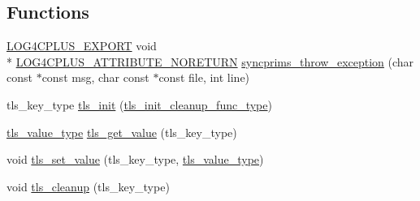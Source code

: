 \subsection*{Functions}
\begin{DoxyCompactItemize}
\item 
\hyperlink{config_8hxx_ab13cb1a5317c245ee2ef4f2bfe0cfb2d}{L\-O\-G4\-C\-P\-L\-U\-S\-\_\-\-E\-X\-P\-O\-R\-T} void \\*
\hyperlink{config_8hxx_a9e2009a9383c0007ef30ca204ad8b3e3}{L\-O\-G4\-C\-P\-L\-U\-S\-\_\-\-A\-T\-T\-R\-I\-B\-U\-T\-E\-\_\-\-N\-O\-R\-E\-T\-U\-R\-N} \hyperlink{namespacelog4cplus_1_1thread_1_1impl_ae8a0c65e304c0b6f4517d161a3fefc4c}{syncprims\-\_\-throw\-\_\-exception} (char const $\ast$const msg, char const $\ast$const file, int line)
\item 
tls\-\_\-key\-\_\-type \hyperlink{namespacelog4cplus_1_1thread_1_1impl_a2d9e610bc473a7dbf97926a4238be82f}{tls\-\_\-init} (\hyperlink{namespacelog4cplus_1_1thread_1_1impl_a4a2c43d8790236ed72370694f70a08c2}{tls\-\_\-init\-\_\-cleanup\-\_\-func\-\_\-type})
\item 
\hyperlink{namespacelog4cplus_1_1thread_1_1impl_a7964c384af774778b462bec9cc6581ea}{tls\-\_\-value\-\_\-type} \hyperlink{namespacelog4cplus_1_1thread_1_1impl_a5bb3a0df53f5294814544c31c5af238e}{tls\-\_\-get\-\_\-value} (tls\-\_\-key\-\_\-type)
\item 
void \hyperlink{namespacelog4cplus_1_1thread_1_1impl_a425a3d17d8589296a321aa3c556c2bca}{tls\-\_\-set\-\_\-value} (tls\-\_\-key\-\_\-type, \hyperlink{namespacelog4cplus_1_1thread_1_1impl_a7964c384af774778b462bec9cc6581ea}{tls\-\_\-value\-\_\-type})
\item 
void \hyperlink{namespacelog4cplus_1_1thread_1_1impl_ab1606f760355d2e28d2ed8c630521f0f}{tls\-\_\-cleanup} (tls\-\_\-key\-\_\-type)
\end{DoxyCompactItemize}


